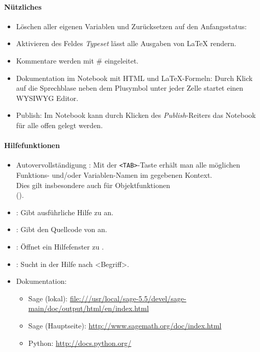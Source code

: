 \documentclass[a4paper,9pt,DIV15,twocolumn]{scrartcl}
\begin{document}
\paragraph{Nützliches}
\begin{itemize}
\item Löschen aller eigenen Variablen und Zurücksetzen auf den Anfangsstatus: {\color{blue} }
\item Aktivieren des Feldes \emph{Typeset} lässt alle Ausgaben von \LaTeX{} rendern.
\item Kommentare werden mit \# eingeleitet.
\item Dokumentation im Notebook mit HTML und \LaTeX{}-Formeln: Durch Klick auf die Sprechblase neben dem Plusymbol unter jeder Zelle startet einen WYSIWYG Editor.
\item Publish: Im Notebook kann durch Klicken des \emph{Publish}-Reiters das Notebook für alle offen gelegt werden. 
\end{itemize}

\paragraph{Hilfefunktionen}
\begin{itemize}
\item {\color{blue} Autovervollständigung :} Mit der {\color{blue} \verb~<TAB>~}-Taste erhält man alle möglichen Funktions- und/oder Variablen-Namen im gegebenen Kontext.\\
Dies gilt insbesondere auch für Objektfunktionen\\ ().
\item {\color{blue}  :} Gibt ausführliche Hilfe zu  an.
\item {\color{blue}  :} Gibt den Quellcode von  an.
\item {\color{blue}  :} Öffnet ein Hilfefenster zu .
\item {\color{blue}  :} Sucht in der Hilfe nach <Begriff>.
\item Dokumentation:
\begin{itemize}
    \item Sage (lokal): {\small\url{file:///usr/local/sage-5.5/devel/sage-main/doc/output/html/en/index.html}}
    \item Sage (Hauptseite): {\small\url{http://www.sagemath.org/doc/index.html}}
\item Python: \url{http://docs.python.org/}
\end{itemize}
\end{itemize}
\end{document}
